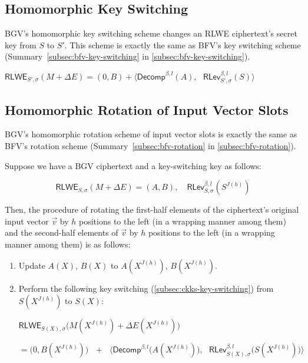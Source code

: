 \subsection{Homomorphic Key Switching}
\label{subsec:bgv-key-switching}

BGV's homomorphic key switching scheme changes an RLWE ciphertext's secret key from $S$ to $S'$. This scheme is exactly the same as BFV's key switching scheme (Summary~\ref*{subsec:bfv-key-switching} in \autoref{subsec:bfv-key-switching}).

\begin{tcolorbox}[title={\textbf{\tboxlabel{\ref*{subsec:bgv-key-switching}} BGV's Key Switching}}]
$\textsf{RLWE}_{S',\sigma}(M + \Delta E) = (0, B) + \bm{\langle} \textsf{Decomp}^{\beta, l}(A), \text{ } \textsf{RLev}_{S', \sigma}^{\beta, l}(S) \bm{\rangle}$
\end{tcolorbox}



\subsection{Homomorphic Rotation of Input Vector Slots}
\label{subsec:bgv-rotation}


BGV's homomorphic rotation scheme of input vector slots is exactly the same as BFV's rotation scheme (Summary~\ref*{subsec:bfv-rotation} in \autoref{subsec:bfv-rotation}). 


\begin{tcolorbox}[title={\textbf{\tboxlabel{\ref*{subsec:bgv-rotation}} BGV's Homomorphic Rotation of Input Vector Slots}}]


Suppose we have a BGV ciphertext and a key-switching key as follows:

\[
\textsf{RLWE}_{S, \sigma}(M + \Delta E) = (A, B), \quad \textsf{RLev}_{S, \sigma}^{\beta, l}(S^{J(h)})
\]

Then, the procedure of rotating the first-half elements of the ciphertext's original input vector $\vec{v}$ by $h$ positions to the left (in a wrapping manner among them) and the second-half elements of $\vec{v}$ by $h$ positions to the left (in a wrapping manner among them) is as follows: 

\begin{enumerate}
\item Update $A(X)$, $B(X)$ to $A(X^{J(h)})$, $B(X^{J(h)})$. 
\item Perform the following key switching (\autoref{subsec:ckks-key-switching}) from $S(X^{J(h)})$ to $S(X)$:

$\textsf{RLWE}_{S(X),\sigma}\bm{(} M(X^{J(h)}) + \Delta E(X^{J(h)})\bm{)} $

$= \bm{(} 0, B(X^{J(h)}) \bm{)} \text{ } + \text{ } \bm{\langle}  \textsf{Decomp}^{\beta, l}\bm{(}A(X^{J(h)})\bm{)}, \text{ } \textsf{RLev}_{S(X), \sigma}^{\beta, l}\bm{(}S(X^{J(h)})\bm{)} \bm{\rangle}$
\end{enumerate}


\end{tcolorbox}




